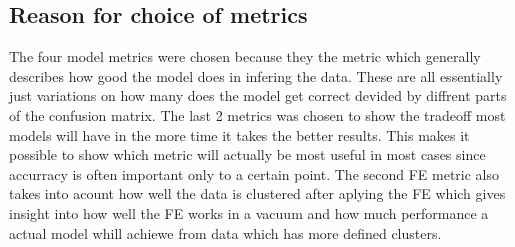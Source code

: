 \subsection{Reason for choice of metrics}
The four model metrics were chosen because they the metric which generally describes how good the model does in infering the data. These are all essentially just variations on
how many does the model get correct devided by diffrent parts of the confusion matrix. The last 2 metrics was chosen to show the tradeoff most models will have in the more time it takes the better results. This makes it possible to show which metric will actually be most useful in most cases since accurracy is often important only to a certain point. The second FE metric also takes into acount how well the data is clustered after aplying the FE which gives insight into how well the FE works in a vacuum and how much performance a actual model whill achiewe from data which has more defined clusters.
